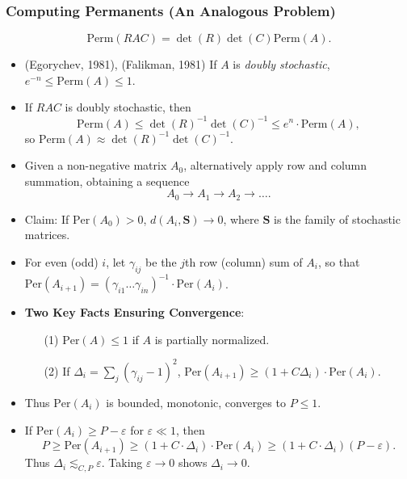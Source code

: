 \documentclass[handout,usenames,dvipsnames,12pt]{beamer}
\begin{document}
\begin{frame}
    \frametitle{Computing Permanents (An Analogous Problem)}

    \[ \text{Perm}(RAC) = \det(R) \det(C) \text{Perm}(A). \]

    \begin{itemize}
        \pause
        \item (Egorychev, 1981), (Falikman, 1981) If $A$ is \emph{doubly stochastic}, $e^{-n} \leq \text{Perm}(A) \leq 1$.

        \pause
        \item If $RAC$ is doubly stochastic, then
        \[ \text{Perm}(A) \leq \det(R)^{-1} \det(C)^{-1} \leq e^n \cdot \text{Perm}(A), \]
        so $\text{Perm}(A) \approx \det(R)^{-1} \det(C)^{-1}$.
    \end{itemize}
\end{frame}

\begin{frame}
    \begin{itemize}
        \item Given a non-negative matrix $A_0$, alternatively apply row and column summation, obtaining a sequence
        \[ A_0 \to A_1 \to A_2 \to \dots. \]

        \pause
        \item Claim: If $\text{Per}(A_0) > 0$, $d(A_i, \mathbf{S}) \to 0$, where $\mathbf{S}$ is the family of stochastic matrices.

        \pause
        \item For even (odd) $i$, let $\gamma_{ij}$ be the $j$th row (column) sum of $A_i$, so that $\text{Per}(A_{i+1}) = (\gamma_{i1} \dots \gamma_{in})^{-1} \cdot \text{Per}(A_i)$.

        \pause
        \item {\bf Two Key Facts Ensuring Convergence}:
        \begin{itemize}
            \pause
            \item[(1)] $\text{Per}(A) \leq 1$ if $A$ is partially normalized.
            \pause
            \item[(2)] If $\Delta_i = \sum_j (\gamma_{ij} - 1)^2$, $\text{Per}(A_{i+1}) \geq (1 + C \Delta_i) \cdot \text{Per}(A_i)$.
        \end{itemize}

        \pause
        \item Thus $\text{Per}(A_i)$ is bounded, monotonic, converges to $P \leq 1$.

        \pause
        \item If $\text{Per}(A_i) \geq P - \varepsilon$ for $\varepsilon \ll 1$, then
        \[ P \geq \text{Per}(A_{i+1}) \geq (1 + C \cdot \Delta_i) \cdot \text{Per}(A_i) \geq (1 + C \cdot \Delta_i)(P - \varepsilon). \]
        Thus $\Delta_i \lesssim_{C,P} \varepsilon$. Taking $\varepsilon \to 0$ shows $\Delta_i \to 0$.
    \end{itemize}
\end{frame}
\end{document}
